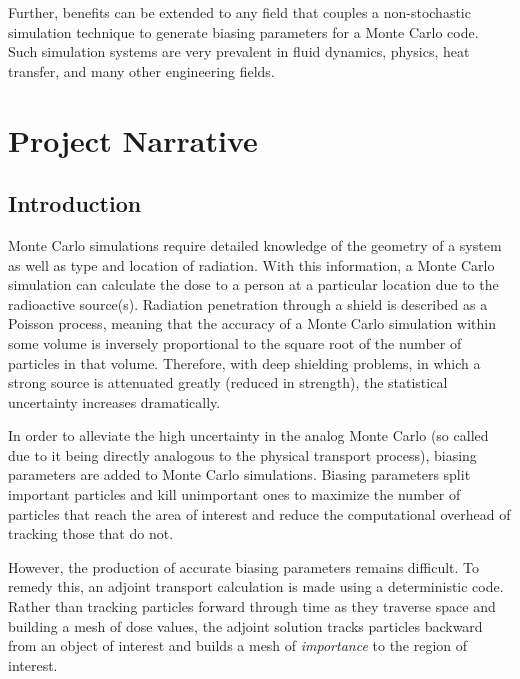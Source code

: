 \documentclass{article}
\begin{document}
Further, benefits can be extended to any field that couples a non-stochastic simulation technique to generate biasing parameters for a Monte Carlo code. Such simulation systems are very prevalent in fluid dynamics, physics, heat transfer, and many other engineering fields.

\section{Project Narrative}\label{sec:b}
\subsection{Introduction}\label{sec:b1}
Monte Carlo simulations require detailed knowledge of the geometry of a system as well as type and location of radiation. With this information, a Monte Carlo simulation can calculate the dose to a person at a particular location due to the radioactive source(s). Radiation penetration through a shield is described as a Poisson process, meaning that the accuracy of a Monte Carlo simulation within some volume is inversely proportional to the square root of the number of particles in that volume. Therefore, with deep shielding problems, in which a strong source is attenuated greatly (reduced in strength), the statistical uncertainty increases dramatically. 

In order to alleviate the high uncertainty in the analog Monte Carlo (so called due to it being directly analogous to the physical transport process), biasing parameters are added to Monte Carlo simulations. Biasing parameters split important particles and kill unimportant ones to maximize the number of particles that reach the area of interest and reduce the computational overhead of tracking those that do not.

However, the production of accurate biasing parameters remains difficult. To remedy this, an adjoint transport calculation is made using a deterministic code. Rather than tracking particles forward through time as they traverse space and building a mesh of dose values, the adjoint solution tracks particles backward from an object of interest and builds a mesh of \textit{importance} to the region of interest.
\end{document}
